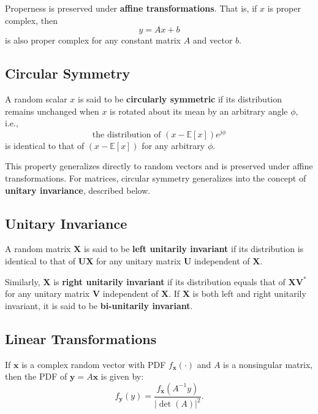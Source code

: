Properness is preserved under \textbf{affine transformations}.  
That is, if \(x\) is proper complex, then
\[
y = A x + b
\]
is also proper complex for any constant matrix \(A\) and vector \(b\).


\subsection{Circular Symmetry}

A random scalar \( x \) is said to be \textbf{circularly symmetric} if its distribution remains unchanged when \(x\) is rotated about its mean by an arbitrary angle \( \phi \), i.e.,
\[
\text{the distribution of } (x - \mathbb{E}[x]) e^{j\phi}
\]
is identical to that of \( (x - \mathbb{E}[x]) \) for any arbitrary \( \phi \).  

This property generalizes directly to random vectors and is preserved under affine transformations.  
For matrices, circular symmetry generalizes into the concept of \textbf{unitary invariance}, described below.


\subsection{Unitary Invariance}

A random matrix \( \mathbf{X} \) is said to be \textbf{left unitarily invariant} if its distribution is identical to that of \( \mathbf{U} \mathbf{X} \) for any unitary matrix \( \mathbf{U} \) independent of \( \mathbf{X} \).  

Similarly, \( \mathbf{X} \) is \textbf{right unitarily invariant} if its distribution equals that of \( \mathbf{X} \mathbf{V}^{*} \) for any unitary matrix \( \mathbf{V} \) independent of \( \mathbf{X} \).  
If \( \mathbf{X} \) is both left and right unitarily invariant, it is said to be \textbf{bi-unitarily invariant}.


\subsection{Linear Transformations}

If \( \mathbf{x} \) is a complex random vector with PDF \( f_{\mathbf{x}}(\cdot) \) and \( A \) is a nonsingular matrix, then the PDF of \( \mathbf{y} = A \mathbf{x} \) is given by:
\begin{equation}
f_{\mathbf{y}}(y) = \frac{f_{\mathbf{x}}(A^{-1} y)}{|\det(A)|^2}.
\tag{C.11}
\end{equation}


